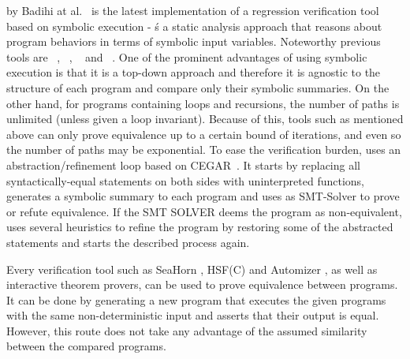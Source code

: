  by Badihi at al.~\cite{10.1145/3368089.3409757} is the latest implementation of a regression verification tool based on symbolic execution - ś a static analysis approach that reasons about program behaviors in terms of symbolic input variables. Noteworthy previous tools are ~\cite{10.1145/3238147.3238178}, ~\cite{10.1007/978-3-319-66706-5_20}, ~\cite{inproceedings} and ~\cite{10.1145/1453101.1453131}. One of the prominent advantages of using symbolic execution is that it is a top-down approach and therefore it is agnostic to the structure of each program and compare only their symbolic summaries. On the other hand, for programs containing loops and recursions, the number of paths is unlimited (unless given a loop invariant). Because of this, tools such as mentioned above can only prove equivalence up to a certain bound of iterations, and even so the number of paths may be exponential. To ease the verification burden,  uses an abstraction/refinement loop based on CEGAR~\cite{10.1007/10722167_15}. It starts by replacing all syntactically-equal statements on both sides with uninterpreted functions, generates a symbolic summary to each program and uses as SMT-Solver to prove or refute equivalence. If the SMT SOLVER deems the program as non-equivalent,  uses several heuristics to refine the program by restoring some of the abstracted statements and starts the described process again.


Every verification tool such as SeaHorn \cite{DBLP:conf/cav/GurfinkelKKN15}, HSF(C) \cite{DBLP:conf/tacas/GrebenshchikovGLPR12} and Automizer \cite{DBLP:conf/cav/HeizmannHP13}, as well as interactive theorem provers, can be used to prove equivalence between programs. It can be done by generating a new program that executes the given programs with the same non-deterministic input and asserts that their output is equal. However, this route does not take any advantage of the assumed similarity between the compared programs.

